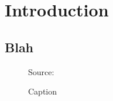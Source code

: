 \section{Introduction}
\subsection{Blah}

\lipsum[2]
\lipsum[3]

\begin{figure}[tb]
    \centering
    
    \caption{Caption} \label{fig:my_label}
    \footnotesize Source: \citet{smith1937wealth}
\end{figure}